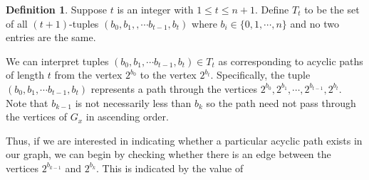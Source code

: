 \documentclass{amsart}
\theoremstyle{definition}
\newtheorem{deff}[theorem]{Definition}
\theoremstyle{plain}
\numberwithin{theorem}{section}
\numberwithin{equation}{section}
\numberwithin{figure}{section}
\newcommand{\0}{\langle 0 \rangle }
\begin{document}
\begin{deff} \label{def:Tt}
    Suppose $t$ is an integer with $1 \leq t \leq n + 1$. Define $T_t$ to be the set of all $(t+1)$-tuples $(b_0, b_1, ,\cdots b_{t - 1}, b_t) $ where $b_i \in \{0, 1, \cdots, n\}$ {and} no two entries are the same.
\end{deff}

We can interpret tuples $(b_0, b_1, \cdots b_{t - 1}, b_t) \in T_t$ as corresponding to acyclic paths of length $t$ from the vertex $2^{b_0}$ to the vertex $2^{b_t}$. Specifically, the tuple $(b_0, b_1, \cdots b_{t - 1}, b_t)$ represents a path through the vertices $2^{b_0}, 2^{b_1},  \cdots , 2^{b_{t-1}}, 2^{b_t}$. Note that $b_{k - 1}$ is not necessarily less than $b_k$ so the path need not pass through the vertices of $G_x$ in ascending order.

Thus, if we are interested in indicating whether a particular acyclic path exists in our graph, we can begin by checking whether there is an edge between the vertices $2^{b_{k-1}}$ and $2^{b_k}$. This is indicated by the value of 
\end{document}
